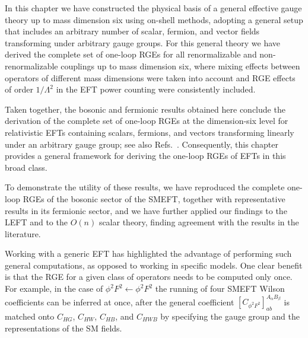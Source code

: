 In this chapter we have constructed the physical basis of a general effective gauge theory up to
mass dimension six using on-shell methods, adopting a general setup that includes an arbitrary
number of scalar, fermion, and vector fields transforming under arbitrary gauge groups. For this
general theory we have derived the complete set of one-loop RGEs for all renormalizable and
non-renormalizable couplings up to mass dimension six, where mixing effects between operators of
different mass dimensions were taken into account and RGE effects of order $1/\Lambda^2$ in
the EFT power counting were consistently included.

Taken together, the bosonic and fermionic results obtained here conclude the derivation of the
complete set of one-loop RGEs at the dimension-six level for relativistic EFTs containing scalars,
fermions, and vectors transforming linearly under an arbitrary gauge group; see also
Refs.~\cite{Fonseca:2025zjb,Misiak:2025xzq,Fonseca:2025cls}. Consequently, this chapter provides a general framework
for deriving the one-loop RGEs of EFTs in this broad class.

To demonstrate the utility of these results, we have reproduced the complete one-loop RGEs of the
bosonic sector of the SMEFT, together with representative results in its fermionic sector, and we
have further applied our findings to the LEFT and to the $O(n)$ scalar theory, finding agreement
with the results in the literature.

Working with a generic EFT has highlighted the advantage of performing such general computations, as
opposed to working in specific models. One clear benefit is that the RGE for a given class of
operators needs to be computed only once. For example, in the case of
$\phi^2 F^2 \leftarrow \phi^2 F^2$ the running of four SMEFT Wilson coefficients can be inferred at
once, after the general coefficient $[C_{\phi^2 F^2}]^{A_\alpha B_\beta}_{ab}$ is matched onto
$C_{HG}$, $C_{HW}$, $C_{HB}$, and $C_{HWB}$ by specifying the gauge group and the representations of
the SM fields.

